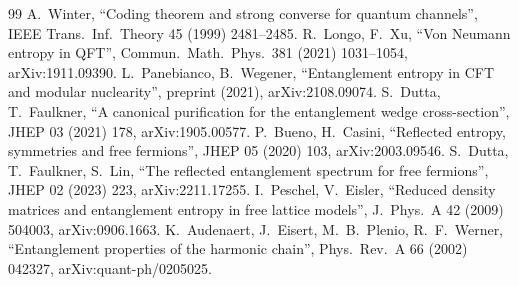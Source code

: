 \documentclass[11pt]{article}
\theoremstyle{definition}\newtheorem{definition}{Definition}[section]
\theoremstyle{remark}\newtheorem*{remark}{Remark}
\begin{document}
\begin{thebibliography}{99}
 A.~Winter, ``Coding theorem and strong converse for quantum channels'', IEEE Trans.\ Inf.\ Theory 45 (1999) 2481--2485.
 R.~Longo, F.~Xu, ``Von Neumann entropy in QFT'', Commun.\ Math.\ Phys.\ 381 (2021) 1031--1054, arXiv:1911.09390.
 L.~Panebianco, B.~Wegener, ``Entanglement entropy in CFT and modular nuclearity'', preprint (2021), arXiv:2108.09074.
 S.~Dutta, T.~Faulkner, ``A canonical purification for the entanglement wedge cross-section'', JHEP 03 (2021) 178, arXiv:1905.00577.
 P.~Bueno, H.~Casini, ``Reflected entropy, symmetries and free fermions'', JHEP 05 (2020) 103, arXiv:2003.09546.
 S.~Dutta, T.~Faulkner, S.~Lin, ``The reflected entanglement spectrum for free fermions'', JHEP 02 (2023) 223, arXiv:2211.17255.
 I.~Peschel, V.~Eisler, ``Reduced density matrices and entanglement entropy in free lattice models'', J.\ Phys.\ A 42 (2009) 504003, arXiv:0906.1663.
 K.~Audenaert, J.~Eisert, M.~B.~Plenio, R.~F.~Werner, ``Entanglement properties of the harmonic chain'', Phys.\ Rev.\ A 66 (2002) 042327, arXiv:quant-ph/0205025.
\end{thebibliography}
\end{document}
